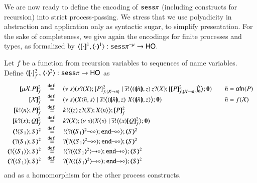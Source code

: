 We are now ready to define the encoding of $\mathtt{sess}\pi$
(including constructs for recursion) into strict process-passing.
We stress that we use polyadicity in abstraction and application only
as syntactic sugar, to simplify presentation.
For the sake of completeness, we give again the encodings for 
finite processes and types, as
formalized by $\encod{\cdot}{\cdot}{1}: \sespnr \to \HO$.

\begin{definition}\rm
	Let $f$ be a function from recursion variables to sequences of name variables.
	Define $\fencod{\cdot}{\cdot}{2}{f}: \sesp \to \HO$ as
%
\[
	\begin{array}{rcll}
		\pmapp{\recp{X}{P}}{2}{f} &\defeq& \newsp{s}{\binp{s}{\X} \pmapp{P}{2}{{f,\{\rvar{X}\to \tilde{n}\}}} \Par \bbout{\dual{s}}{\abs{\vmap{\tilde{n}}, z } \,{\binp{z}{\X} \auxmapp{\pmapp{P}{2}{{f,\{\rvar{X}\to \tilde{n}\}}}}{\mathsf{v}}{\es}}} \inact} & \quad \tilde{n} = \ofn{P} \\ 
		\pmapp{\rvar{X}}{2}{f} &\defeq& \newsp{s}{\appl{\X}{\tilde{n}, s} \Par \bbout{\dual{s}}{ \abs{\vmap{\tilde{n}},z}\,\,{\appl{X}{ \vmap{\tilde{n}}, z}}} \inact} & \quad \tilde{n} = f(\rvar{X}) \\
		\pmapp{\bout{k}{n} P}{2}{f}	&\defeq&	\bbout{k}{ \abs{z}{\,\binp{z}{X} \appl{X}{n}} } \pmapp{P}{2}{f} \\
		\pmapp{\binp{k}{x} Q}{2}{f}	&\defeq&	\binp{k}{X} \newsp{s}{\appl{X}{s} \Par \bbout{\dual{s}}{\abs{x} \pmapp{Q}{2}{f}} \inact} \\
		\tmap{\btout{S_1} {S} }{2}	&\defeq&	\bbtout{\lhot{\btinp{\lhot{\tmap{S_1}{2}}}\tinact}} \tmap{S}{2}  \\
		\tmap{\btinp{S_1} S }{2}	&\defeq&	\bbtinp{\lhot{\btinp{\lhot{\tmap{S_1}{2}}}\tinact}} \tmap{S}{2} \\
		\tmap{\bbtout{\chtype{S_1}} {S} }{2}	&\defeq&	\bbtout{\shot{\btinp{\shot{\chtype{\tmap{S_1}{2}}}}\tinact}} \tmap{S}{2}  \\
		\tmap{\bbtinp{\chtype{S_1}} {S} }{2}	&\defeq&	\bbtinp{\shot{\btinp{\shot{\chtype{\tmap{S_1}{2}}}}\tinact}} \tmap{S}{2}
	\end{array}
\]
%
and as a homomorphism for the other process constructs. 
\end{definition}

